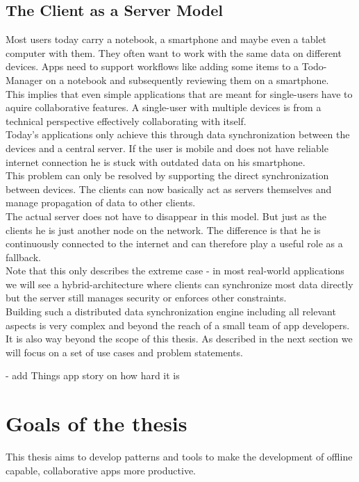 \subsection{The Client as a Server Model}
Most users today carry a notebook, a smartphone and maybe even a tablet computer with them.
They often want to work with the same data on different devices.
Apps need to support workflows like adding some items to a Todo-Manager on a notebook and subsequently reviewing them on a smartphone.\\
This implies that even simple applications that are meant for single-users have to aquire collaborative features.
A single-user with multiple devices is from a technical perspective effectively collaborating with itself.\\
Today's applications only achieve this through  data synchronization between the devices and a central server.
If the user is mobile and does not have reliable internet connection he is stuck with outdated data on his smartphone.\\
This problem can only be resolved by supporting the direct synchronization between devices.
The clients can now basically act as servers themselves and manage propagation of data to other clients.\\
The actual server does not have to disappear in this model.
But just as the clients he is just another node on the network.
The difference is that he is continuously connected to the internet and can therefore play a useful role as a fallback.\\
Note that this only describes the extreme case - in most real-world applications we will see a hybrid-architecture where clients can synchronize most data directly but the server still manages security or enforces other constraints.\\
Building such a distributed data synchronization engine including all relevant aspects is very complex and beyond the reach of a small team of app developers.
It is also way beyond the scope of this thesis.
As described in the next section we will focus on a set of use cases and problem statements.

- add Things app story on how hard it is

\section{Goals of the thesis}
This thesis aims to develop patterns and tools to make the development of offline capable, collaborative apps more productive.\\

